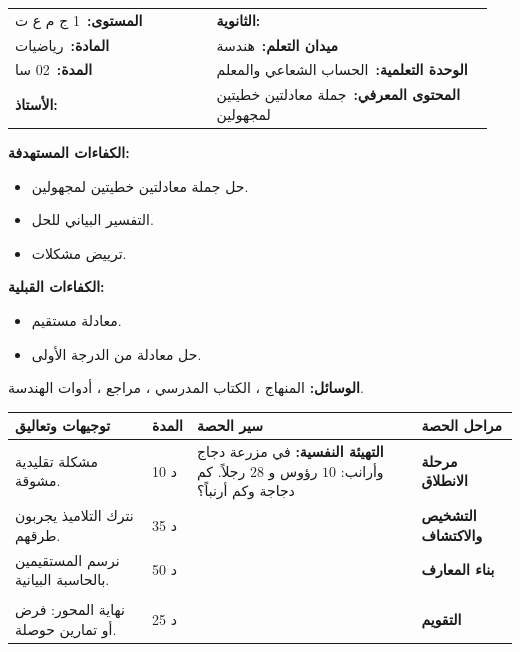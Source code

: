 \documentclass[12pt,a4paper]{article}
\makeatletter
\newenvironment{LTR}{\begin{otherlanguage}{english}}{\end{otherlanguage}}
\newcommand{\ar}[1]{\foreignlanguage{arabic}{#1}}
\newcommand{\Phase}[1]{\textbf{#1}}
\newcommand{\Fld}[2]{\textbf{#1:}\ #2}
\newcommand{\ModhHead}[9]{%
\begin{LTR}
\begin{tcolorbox}[enhanced,colback=white,colframe=cThm!85!black,arc=4mm,boxrule=1pt,top=14pt,bottom=6pt,left=8pt,right=8pt,
 overlay={\node[fill=cThm!85!black,text=white,rounded corners=3mm,inner xsep=14pt,inner ysep=4pt,font=\large\bfseries] at ([yshift=0pt]frame.north){\ar{مذكرة رقم #1}};},
 before upper={\selectlanguage{arabic}}]
\begin{tabular}{@{}p{0.4\linewidth}p{0.55\linewidth}@{}}
\Fld{المستوى}{#2} & \Fld{الثانوية}{\dotfill}\\[3pt]
\Fld{المادة}{رياضيات} & \Fld{ميدان التعلم}{#3}\\[3pt]
\Fld{المدة}{#5} & \Fld{الوحدة التعلمية}{#4}\\[3pt]
\Fld{الأستاذ}{\dotfill} & \Fld{المحتوى المعرفي}{#6}\\
\end{tabular}
\end{tcolorbox}
\begin{tcolorbox}[enhanced,colback=white,colframe=cThm!85!black,arc=3mm,boxrule=0.8pt,sidebyside,sidebyside align=top,lefthand ratio=0.5,
 segmentation style={dashed,cThm!60},before upper={\selectlanguage{arabic}},before lower={\selectlanguage{arabic}}]
\textbf{الكفاءات المستهدفة:}\par #8
\tcblower
\textbf{الكفاءات القبلية:}\par #7
\end{tcolorbox}
\end{LTR}
\par\smallskip\textbf{الوسائل:} #9\par\smallskip}
\newenvironment{Sayr}{%
\begin{LTR}\renewcommand{\arraystretch}{1.25}
\begin{longtable}{|p{0.17\textwidth}|>{\centering\arraybackslash}p{0.06\textwidth}|p{0.53\textwidth}|>{\centering\arraybackslash}p{0.12\textwidth}|}
\hline\rowcolor{cThm!12}\ar{\textbf{توجيهات وتعاليق}} & \ar{\textbf{المدة}} & \ar{\textbf{سير الحصة}} & \ar{\textbf{مراحل الحصة}}\\\hline\endhead
\hline\endfoot}{\end{longtable}\end{LTR}}
\newcommand{\Row}[4]{\ar{\small #4} & \ar{#3} & \ar{#2} & \cellcolor{cThm!8}\ar{\Phase{#1}}\\\hline}
\newcommand{\Lab}[2]{\foreignlanguage{english}{\tcbox[on line,colback=#1,colframe=#1,boxrule=0pt,arc=2pt,boxsep=1pt,left=5pt,right=5pt,top=1pt,bottom=1pt]{\ar{\textcolor{white}{\textbf{#2}}}}}}
\newcommand{\Num}[1]{\foreignlanguage{english}{\tikz[baseline=(c.base)]\node[fill=cDef,text=white,inner sep=2pt,font=\footnotesize\bfseries](c){#1};}}
\newcommand{\ck}{\ensuremath{{\color{cRem}\checkmark}}}
\makeatother
\begin{document}
\newpage
\ModhHead{22}{1 ج م ع ت}{هندسة}{الحساب الشعاعي والمعلم}{02 سا}{جملة معادلتين خطيتين لمجهولين}%
{\begin{itemize}\item معادلة مستقيم.\item حل معادلة من الدرجة الأولى.\end{itemize}}%
{\begin{itemize}\item حل جملة معادلتين خطيتين لمجهولين.\item التفسير البياني للحل.\item ترييض مشكلات.\end{itemize}}%
{المنهاج ، الكتاب المدرسي ، مراجع ، أدوات الهندسة.}
\begin{Sayr}
\Row{مرحلة الانطلاق}{%
\textbf{التهيئة النفسية:} في مزرعة دجاج وأرانب: $10$ رؤوس و $28$ رجلاً. كم دجاجة وكم أرنباً؟}{10 د}{مشكلة تقليدية مشوقة.}
\Row{التشخيص والاكتشاف}{%
\Lab{cEx}{مناقشة نشاط 07 صفحة 253}\par\ck\ نسمي $x$ عدد الدجاج و $y$ عدد الأرانب: $x+y=10$ و $2x+4y=28$.\par
\ck\ بالتعويض: $x=10-y$ ، $20-2y+4y=28$ ، $y=4$ ، $x=6$.\par
\ck\ كل معادلة هي معادلة مستقيم ، والحل هو إحداثيا نقطة تقاطعهما $(6;4)$.\par
}{35 د}{نترك التلاميذ يجربون طرقهم.}
\Row{بناء المعارف}{%
\Lab{cThm}{خاصية}\ الجملة $\begin{cases}ax+by=c\\a^{\prime}x+b^{\prime}y=c^{\prime}\end{cases}$:\par\ck\ إذا كان $ab^{\prime}-a^{\prime}b\ne0$: حل وحيد (مستقيمان متقاطعان).\par
\ck\ إذا كان $ab^{\prime}-a^{\prime}b=0$: لا حل (مستقيمان متوازيان تماماً) أو ما لا نهاية من الحلول (منطبقان).\par
\Lab{cMeth}{طرق الحل}\ التعويض ، الجمع (التركيب الخطي) ، أو الحل البياني (تقريبي).\par}{50 د}{نرسم المستقيمين بالحاسبة البيانية.}
\Row{}{%
\Lab{cEx}{مشكلة}\ تذكرتان للكبار و $3$ للصغار بـ $1300$ DA ، وتذكرة كبير و $2$ للصغار بـ $750$ DA: \ $2a+3c=1300$ و $2a+4c=1500$ ، بالطرح $c=200$ ثم $a=350$.\par\Lab{cThm!80!black}{حذار}\ نتحقق دائماً من الحل في المعادلتين.}{}{}
\Row{التقويم}{%
\Lab{cEx}{تطبيق}\par حل: \Num{1} $\begin{cases}3x-2y=4\\x+y=3\end{cases}$ \quad \Num{2} $\begin{cases}x-2y=1\\-2x+4y=3\end{cases}$\par\textbf{الحل:} \Num{1} $(2;1)$ ؛ \Num{2} $1\times4-(-2)(-2)=0$ والمستقيمان متوازيان: لا حل.\par\textbf{واجب منزلي:} تمارين حوصلة المحور من الكتاب المدرسي.\par\smallskip\textbf{ملاحظات حول سير الحصة:} \dotfill}{25 د}{نهاية المحور: فرض أو تمارين حوصلة.}
\end{Sayr}
\end{document}
